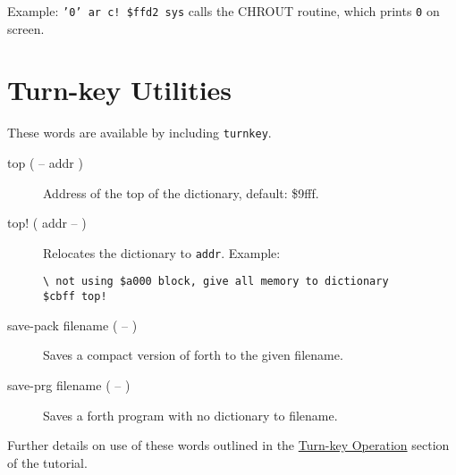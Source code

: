 Example: \texttt{'0' ar c! \$ffd2 sys} calls the CHROUT routine, which prints \texttt{0} on screen.

\section{Turn-key Utilities}
These words are available by including \texttt{turnkey}.
\begin{description}
\item[top ( -- addr )] Address of the top of the dictionary, default: \$9fff.

\item[top! ( addr -- )] Relocates the dictionary to \texttt{addr}. Example:

\begin{verbatim}
\ not using $a000 block, give all memory to dictionary
$cbff top!
\end{verbatim}

\item[save-pack filename ( -- )] Saves a compact version of forth to the given filename.
\item[save-prg filename ( -- )] Saves a forth program with no dictionary to filename.
\end{description}

	Further details on use of these words outlined in the \hyperref[Turn-key Operation]{Turn-key Operation} section of the tutorial.
